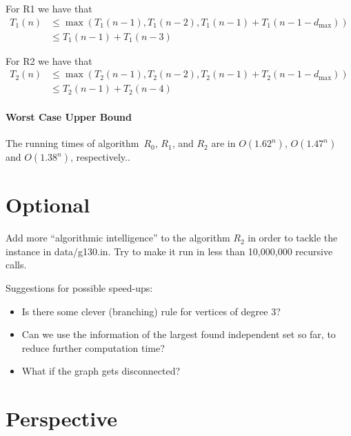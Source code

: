 \documentclass{tufte-handout}
\begin{document}
For R1 we have that
 \begin{align*}
 T_1(n) &\leq\max(T_1(n-1), T_1(n-2), T_1(n-1)+T_1(n-1-d_{\mbox{max}})) \\
        &\leq T_1(n-1)+T_1(n-3)
 \end{align*}

For R2 we have that
  \begin{align*}
  T_2(n) &\leq\max(T_2(n-1), T_2(n-2), T_2(n-1)+T_2(n-1-d_{\mbox{max}})) \\
         &\leq T_2(n-1)+T_2(n-4)
  \end{align*}
\paragraph{Worst Case Upper Bound}
The running times of algorithm~$R_0$, $R_1$, and $R_2$ are in
$O(1.62^n)$, $O(1.47^n)$ and $O(1.38^n)$, respectively.. \newpage

\section{Optional}
Add more ``algorithmic intelligence'' to the algorithm $R_2$ in order to tackle the instance in data/g130.in.
Try to make it run in less than 10,000,000 recursive calls. 

Suggestions for possible speed-ups:
\begin{itemize}
\item Is there some clever (branching) rule for vertices of degree 3?
\item Can we use the information of the largest found independent set so far, to reduce further computation time?
\item What if the graph gets disconnected?
\end{itemize}

\newpage
\section{ Perspective}
\end{document}
